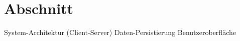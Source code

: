 \section{Abschnitt}
\label{sec:fachkonzept-implementierung}

System-Architektur (Client-Server)
Daten-Persistierung
Benutzeroberfläche